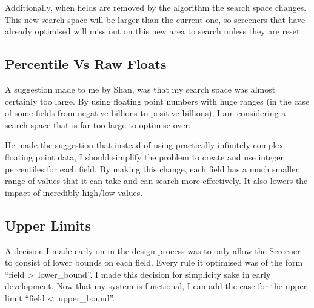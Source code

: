Additionally, when fields are removed by the algorithm the search space changes. This new search space will be larger than the current one, so screeners that have already optimised will miss out on this new area to search unless they are reset.

\subsection{Percentile Vs Raw Floats}
A suggestion made to me by Shan, was that my search space was almost certainly too large. By using floating point numbers with huge ranges (in the case of some fields from negative billions to positive billions), I am considering a search space that is far too large to optimise over. \newline

He made the suggestion that instead of using practically infinitely complex floating point data, I should simplify the problem to create and use integer percentiles for each field. By making this change, each field has a much smaller range of values that it can take and can search more effectively. It also lowers the impact of incredibly high/low values.

\subsection{Upper Limits}
A decision I made early on in the design process was to only allow the Screener to consist of lower bounds on each field. Every rule it optimised was of the form ``field \textgreater \, lower\_bound''. I made this decision for simplicity sake in early development. Now that my system is functional, I can add the case for the upper limit ``field \textless \, upper\_bound''. \newline